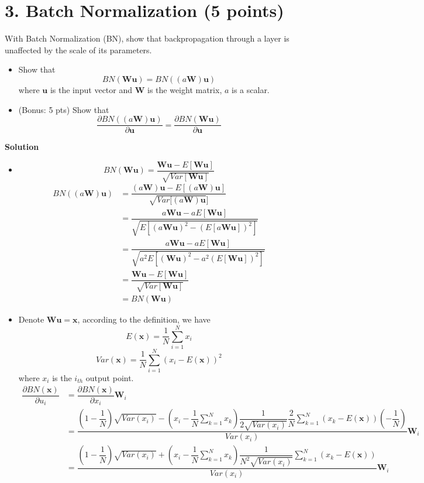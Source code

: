 \documentclass[12pt]{article}%
\begin{document}
\section*{3. Batch Normalization (5 points)}
With Batch Normalization (BN), show that backpropagation through a layer is unaffected by the scale of its parameters. 
\begin{itemize}
	\item Show that \[BN(\mathbf{Wu})=BN((a\mathbf{W})\mathbf{u})\] where $\mathbf{u}$ is the input vector and $\mathbf{W}$ is the weight matrix, $a$ is a scalar. 
	\item (Bonus: 5 pts) Show that 
	\[\frac{\partial BN((a\mathbf{W})\mathbf{u})}{\partial \mathbf{u}}=\frac{\partial BN(\mathbf{W}\mathbf{u})}{\partial \mathbf{u}}\]
\end{itemize}
\textbf{Solution}
\begin{itemize}
	\item \[ BN(\mathbf{Wu})=\dfrac{\mathbf{Wu}-E[\mathbf{Wu}]}{\sqrt{Var[\mathbf{Wu}]}} \]
	\begin{align*}
	BN((a\mathbf{W})\mathbf{u})&=\dfrac{(a\mathbf{W})\mathbf{u}-E[(a\mathbf{W})\mathbf{u}]}{\sqrt{Var[(a\mathbf{W})\mathbf{u}}]}\\
	&=\dfrac{a\mathbf{Wu}-aE[\mathbf{Wu}]}{\sqrt{E[(a\mathbf{Wu})^2-(E[a\mathbf{Wu}])^2]}}\\
	&=\dfrac{a\mathbf{Wu}-aE[\mathbf{Wu}]}{\sqrt{a^2E[(\mathbf{Wu})^2-a^2(E[\mathbf{Wu}])^2]}}\\
	&=\dfrac{\mathbf{Wu}-E[\mathbf{Wu}]}{\sqrt{Var[\mathbf{Wu}]}}\\
	&=BN(\mathbf{Wu})
	\end{align*}
	\item Denote $ \mathbf{Wu}=\mathbf{x} $, according to the definition, we have
	\[ E(\mathbf{x})=\dfrac{1}{N}\sum_{i=1}^{N}x_i \]
	\[ Var(\mathbf{x})=\dfrac{1}{N}\sum_{i=1}^{N}(x_i-E(\mathbf{x}))^2 \]
	where $ x_i $ is the $ i_{th} $ output point.
	\begin{align*}
	\dfrac{\partial BN(\mathbf{x})}{\partial u_i}&=\dfrac{\partial BN(\mathbf{x})}{\partial x_i}\mathbf{W}_i\\
	&=\dfrac{(1-\dfrac{1}{N})\sqrt{Var(x_i)} - (x_i-\dfrac{1}{N}\sum\limits_{k=1}^{N}x_k)\dfrac{1}{2\sqrt{Var(x_i)}}\dfrac{2}{N}\sum\limits_{k=1}^{N}(x_k-E(\mathbf{x}))(-\dfrac{1}{N})}{Var(x_i)}\mathbf{W}_i\\
	&=\dfrac{(1-\dfrac{1}{N})\sqrt{Var(x_i)} + (x_i-\dfrac{1}{N}\sum\limits_{k=1}^{N}x_k)\dfrac{1}{N^2\sqrt{Var(x_i)}}\sum\limits_{k=1}^{N}(x_k-E(\mathbf{x}))}{Var(x_i)}\mathbf{W}_i

\end{align*}
\end{itemize}
\end{document}
